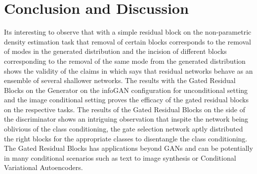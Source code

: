 

\section{Conclusion and Discussion}
Its interesting to observe that with a simple residual block on the non-parametric density estimation task that removal of certain blocks corresponds to the removal of modes in the generated distribution and the incision of different blocks corresponding to the removal of the same mode from the generated distribution shows the validity of the claims in \cite{veit2016residual} which says that residual networks behave as an ensemble of several shallower networks. The results with the Gated Residual Blocks on the Generator on the infoGAN configuration for unconditional setting and the image conditional setting proves the efficacy of the gated residual blocks on the respective tasks. The results of the Gated Residual Blocks on the side of the discriminator shows an intriguing observation that inspite the network being oblivious of the class conditioning, the gate selection network aptly distributed the right blocks for the appropriate classes to disentangle the class conditioning. The Gated Residual Blocks has applications beyond GANs and can be potentially in many conditional scenarios such as text to image synthesis or Conditional Variational Autoencoders. 


